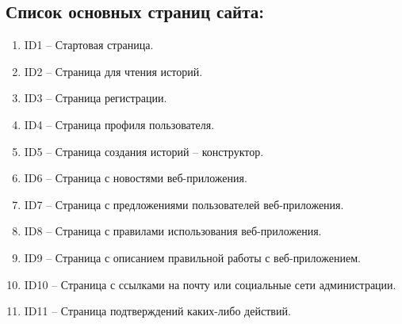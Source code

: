 \documentclass[a4paper]{article}
\begin{document}
		\subsection{Список основных страниц сайта:}
			\begin{enumerate}
				\item ID1 – Стартовая страница.
				\item ID2 – Страница для чтения историй.
				\item ID3 – Страница регистрации.
				\item ID4 – Страница профиля пользователя.
				\item ID5 – Страница создания историй – конструктор.
				\item ID6 – Страница с новостями веб-приложения.
				\item ID7 – Страница с предложениями пользователей веб-приложения.
				\item ID8 – Страница с правилами использования веб-приложения.
				\item ID9 – Страница с описанием правильной работы с веб-приложением.
				\item ID10 – Страница с ссылками на почту или социальные сети администрации.
				\item ID11 – Страница подтверждений каких-либо действий.
			\end{enumerate}
		\newpage
\end{document}
